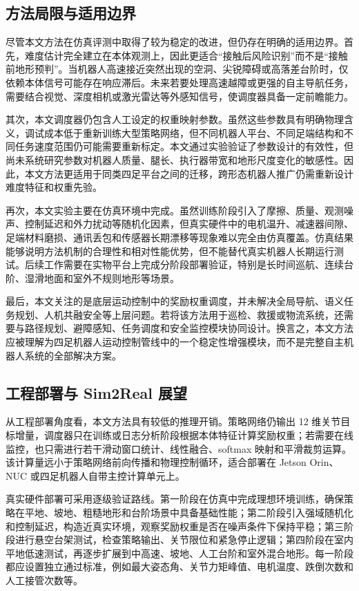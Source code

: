 \documentclass[12pt,a4paper]{ctexart}
\numberwithin{equation}{section}
\numberwithin{table}{section}
\numberwithin{figure}{section}
\begin{document}
\subsection{方法局限与适用边界}
尽管本文方法在仿真评测中取得了较为稳定的改进，但仍存在明确的适用边界。首先，难度估计完全建立在本体观测上，因此更适合“接触后风险识别”而不是“接触前地形预判”。当机器人高速接近突然出现的空洞、尖锐障碍或高落差台阶时，仅依赖本体信号可能存在响应滞后。未来若要处理高速越障或更强的自主导航任务，需要结合视觉、深度相机或激光雷达等外感知信号，使调度器具备一定前瞻能力。

其次，本文调度器仍包含人工设定的权重映射参数。虽然这些参数具有明确物理含义，调试成本低于重新训练大型策略网络，但不同机器人平台、不同足端结构和不同任务速度范围仍可能需要重新标定。本文通过实验验证了参数设计的有效性，但尚未系统研究参数对机器人质量、腿长、执行器带宽和地形尺度变化的敏感性。因此，本文方法更适用于同类四足平台之间的迁移，跨形态机器人推广仍需重新设计难度特征和权重先验。

再次，本文实验主要在仿真环境中完成。虽然训练阶段引入了摩擦、质量、观测噪声、控制延迟和外力扰动等随机化因素，但真实硬件中的电机温升、减速器间隙、足端材料磨损、通讯丢包和传感器长期漂移等现象难以完全由仿真覆盖。仿真结果能够说明方法机制的合理性和相对性能优势，但不能替代真实机器人长期运行测试。后续工作需要在实物平台上完成分阶段部署验证，特别是长时间巡航、连续台阶、湿滑地面和室外不规则地形等场景。

最后，本文关注的是底层运动控制中的奖励权重调度，并未解决全局导航、语义任务规划、人机共融安全等上层问题。若将该方法用于巡检、救援或物流系统，还需要与路径规划、避障感知、任务调度和安全监控模块协同设计。换言之，本文方法应被理解为四足机器人运动控制管线中的一个稳定性增强模块，而不是完整自主机器人系统的全部解决方案。

\subsection{工程部署与 Sim2Real 展望}
从工程部署角度看，本文方法具有较低的推理开销。策略网络仍输出 12 维关节目标增量，调度器只在训练或日志分析阶段根据本体特征计算奖励权重；若需要在线监控，也只需进行若干滑动窗口统计、线性融合、softmax 映射和平滑裁剪运算。该计算量远小于策略网络前向传播和物理控制循环，适合部署在 Jetson Orin、NUC 或四足机器人自带主控计算单元上。

真实硬件部署可采用逐级验证路线。第一阶段在仿真中完成理想环境训练，确保策略在平地、坡地、粗糙地形和台阶场景中具备基础性能；第二阶段引入强域随机化和控制延迟，构造近真实环境，观察奖励权重是否在噪声条件下保持平稳；第三阶段进行悬空台架测试，检查策略输出、关节限位和紧急停止逻辑；第四阶段在室内平地低速测试，再逐步扩展到中高速、坡地、人工台阶和室外混合地形。每一阶段都应设置独立通过标准，例如最大姿态角、关节力矩峰值、电机温度、跌倒次数和人工接管次数等。
\end{document}
